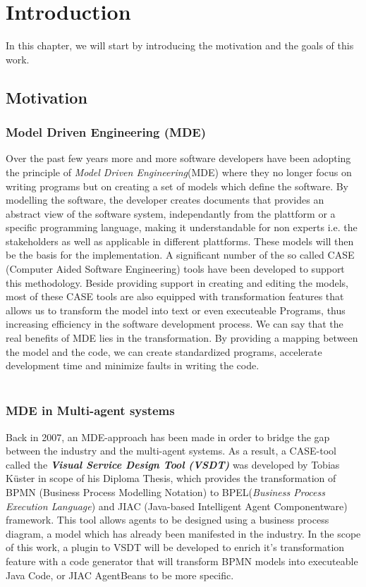 \chapter{Introduction}
In this chapter, we will start by introducing the motivation and the goals of this work. 
\section{Motivation}
\label{sec:Motivation}
\subsection{Model Driven Engineering (MDE)}
Over the past few years more and more software developers have been adopting the principle of \textit{Model Driven Engineering}(MDE) where 
they no longer focus on writing programs but on creating a set of models which define the software. By modelling the software, the developer creates documents that provides an abstract view of the software system, independantly from the plattform or a specific programming language, making it understandable for non experts i.e. the stakeholders as well as applicable in different plattforms. These models will then be the basis for the implementation. A significant number of the so called  CASE (Computer Aided Software Engineering) tools have been developed to support this methodology. Beside providing support in creating and editing the models, most of these CASE tools are also equipped with transformation features that allows us to transform the model into text or even executeable Programs, thus increasing efficiency in the software development process. We can say that the real benefits of MDE lies in the transformation. By providing a mapping between the model and the code, we can create standardized programs, accelerate development time and minimize faults in writing the code. \\\\

\subsection{MDE in Multi-agent systems}
Back in 2007, an MDE-approach has been made in order to bridge the gap between the industry and the multi-agent systems. As a result, a CASE-tool called the \textbf{\textit{Visual Service Design Tool (VSDT)}} was developed by Tobias K\"uster in scope of his Diploma Thesis, which provides the transformation of BPMN (Business Process Modelling Notation) to BPEL(\textit{Business Process Execution Language}) and JIAC (Java-based Intelligent Agent Componentware) framework. This tool allows agents to be designed using a business process diagram, a model which has already been manifested in the industry. In the scope of this work, a plugin to VSDT will be developed to enrich it's transformation feature with a code generator that will transform BPMN models into executeable Java Code, or JIAC AgentBeans to be more specific. 

